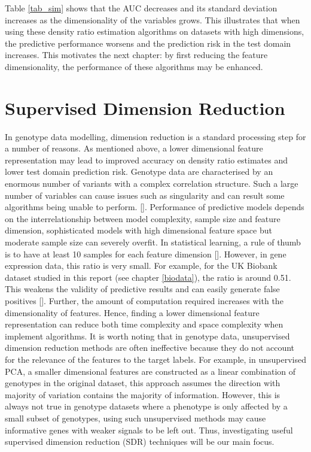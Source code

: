 \documentclass[a4paper,12pt]{article}
\begin{document}
Table \ref{tab_sim} shows that the AUC decreases and its standard deviation increases as the dimensionality of the variables grows. This illustrates that when using these density ratio estimation algorithms on datasets with high dimensions, the predictive performance worsens and the prediction risk in the test domain increases. This motivates the next chapter: by first reducing the feature dimensionality, the performance of these algorithms may be enhanced.



\pagebreak
%
%
%
%
%
%
\section{Supervised Dimension Reduction} \label{Supervised Dimension Reduction}
In genotype data modelling, dimension reduction is a standard processing step for a number of reasons. As mentioned above, a lower dimensional feature representation may lead to improved accuracy on density ratio estimates and lower test domain prediction risk. Genotype data are characterised by an enormous number of variants with a complex correlation structure. Such a large number of variables can cause issues such as singularity and can result some algorithms being unable to perform. [\cite{wang2011dimension}]. Performance of predictive models depends on the interrelationship between model complexity, sample size and feature dimension, sophisticated models with high dimensional feature space but moderate sample size can severely overfit. In statistical learning, a rule of thumb is to have at least 10 samples for each feature dimension [\cite{jain2000statistical}]. However, in gene expression data, this ratio is very small. For example, for the UK Biobank dataset studied in this report (see chapter \ref{biodata}), the ratio is around 0.51. This weakens the validity of predictive results and can easily generate false positives [\cite{wang2008approaches}]. Further, the amount of computation required increases with the dimensionality of features. Hence, finding a lower dimensional feature representation can reduce both time complexity and space complexity when implement algorithms. It is worth noting that in genotype data, unsupervised dimension reduction methods are often ineffective because they do not account for the relevance of the features to the target labels. For example, in unsupervised PCA, a smaller dimensional features are constructed as a linear combination of genotypes in the original dataset, this approach assumes the direction with majority of variation contains the majority of information. However, this is always not true in genotype datasets where a phenotype is only affected by a small subset of genotypes, using such unsupervised methods may cause informative genes with weaker signals to be left out. Thus, investigating useful supervised dimension reduction (SDR) techniques will be our main focus. 
\end{document}
